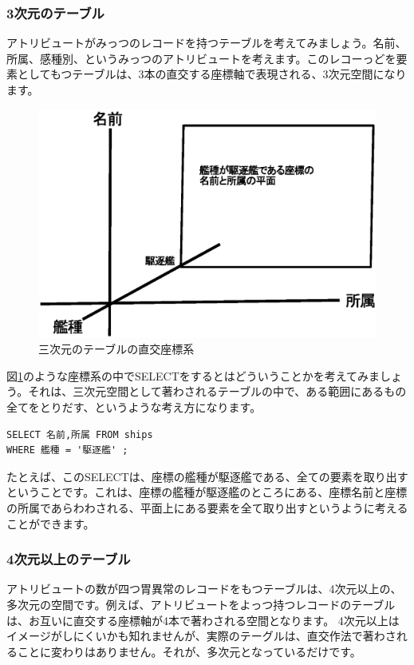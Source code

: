 \subsubsection{3次元のテーブル}

アトリビュートがみっつのレコードを持つテーブルを考えてみましょう。名前、所属、感種別、というみっつのアトリビュートを考えます。このレコーっどを要素としてもつテーブルは、3本の直交する座標軸で表現される、3次元空間になります。

\begin{figure}[htbp]
	\includegraphics[width=12cm,clip]{draw/3daxis.eps}
	\caption{三次元のテーブルの直交座標系}
	\label{fig:3daxis}
\end{figure}

図\ref{fig:3daxis}のような座標系の中でSELECTをするとはどういうことかを考えてみましょう。それは、三次元空間として著わされるテーブルの中で、ある範囲にあるもの全てをとりだす、というような考え方になります。

\begin{verbatim}
SELECT 名前,所属 FROM ships
WHERE 艦種 = '駆逐艦' ;
\end{verbatim}

たとえば、このSELECTは、座標の艦種が駆逐艦である、全ての要素を取り出すということです。これは、座標の艦種が駆逐艦のところにある、座標名前と座標の所属であらわわされる、平面上にある要素を全て取り出すというように考えることができます。

\subsubsection{4次元以上のテーブル}

アトリビュートの数が四つ胃異常のレコードをもつテーブルは、4次元以上の、多次元の空間です。例えば、アトリビュートをよっつ持つレコードのテーブルは、お互いに直交する座標軸が4本で著わされる空間となります。
4次元以上はイメージがしにくいかも知れませんが、実際のテーグルは、直交作法で著わされることに変わりはありません。それが、多次元となっているだけです。

